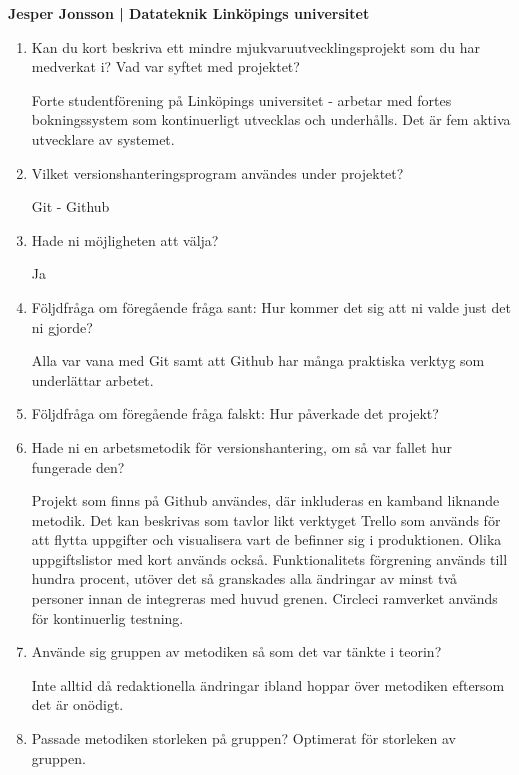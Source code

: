 \clearpage
\begin{center}
    \textbf{Jesper Jonsson | Datateknik Linköpings universitet}
\end{center}
\begin{enumerate}

  \item Kan du kort beskriva ett mindre mjukvaruutvecklingsprojekt som du har medverkat i? Vad var syftet med projektet?

  Forte studentförening på Linköpings universitet - arbetar med fortes bokningssystem som kontinuerligt utvecklas och underhålls. Det är fem aktiva utvecklare av systemet.

  \item Vilket versionshanteringsprogram användes under projektet?

  Git - Github

  \item Hade ni möjligheten att välja?

  Ja

  \item Följdfråga om föregående fråga sant: Hur kommer det sig att ni valde just det ni gjorde?

  Alla var vana med Git samt att Github har många praktiska verktyg som underlättar arbetet.

  \item Följdfråga om föregående fråga falskt: Hur påverkade det projekt?

  \item Hade ni en arbetsmetodik för versionshantering, om så var fallet hur fungerade den?

  Projekt som finns på Github användes, där inkluderas en kamband liknande metodik. Det kan beskrivas som tavlor likt verktyget Trello som används för att flytta uppgifter och visualisera vart de befinner sig i produktionen. Olika uppgiftslistor med kort används också. Funktionalitets förgrening används till hundra procent, utöver det så granskades alla ändringar av minst två personer innan de integreras med huvud grenen. Circleci ramverket används för kontinuerlig testning.

  \item Använde sig gruppen av metodiken så som det var tänkte i teorin?

  Inte alltid då redaktionella ändringar ibland hoppar över metodiken eftersom det är onödigt.

  \item Passade metodiken storleken på gruppen?
  Optimerat för storleken av gruppen.


\end{enumerate}
